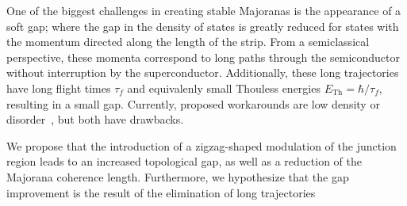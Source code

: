 
	One of the biggest challenges in creating stable Majoranas is the appearance of a soft gap; where the gap in the density of states is greatly reduced for states with the momentum directed along the length of the strip.
	From a semiclassical perspective, these momenta correspond to long paths through the semiconductor without interruption by the superconductor.
	Additionally, these long trajectories have long flight times $\tau_f$ and equivalenly small Thouless energies $E_{\textrm{Th}}=\hbar / \tau_f$, resulting in a small gap. 
	Currently, proposed workarounds are low density or disorder~\cite{haim_double-edge_2018}, but both have drawbacks.


	We propose that the introduction of a zigzag-shaped modulation of the junction region leads to an increased topological gap, as well as a reduction of the Majorana coherence length.
	Furthermore, we hypothesize that the gap improvement is the result of the elimination of long trajectories